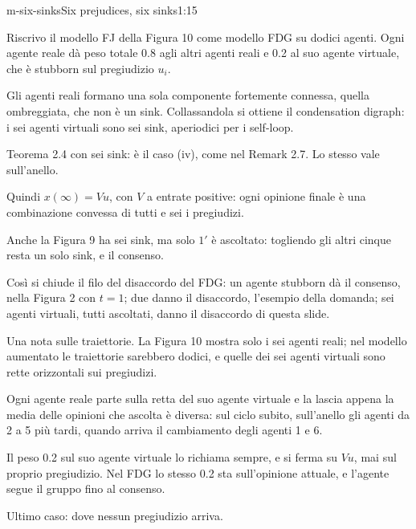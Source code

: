 \begin{slidedue}{m-six-sinks}{Six prejudices, six sinks}{1:15}
  \begin{discorso}
    \item Riscrivo il modello FJ della Figura 10 come modello FDG su dodici agenti. Ogni agente reale dà peso totale 0.8 agli altri agenti reali e 0.2 al suo agente virtuale, che è stubborn sul pregiudizio $u_i$.
    \item Gli agenti reali formano una sola componente fortemente connessa, quella ombreggiata, che non è un sink. Collassandola si ottiene il condensation digraph: i sei agenti virtuali sono sei sink, aperiodici per i self-loop.
    \item Teorema 2.4 con sei sink: è il caso (iv), come nel Remark 2.7. Lo stesso vale sull'anello.
    \item Quindi $x(\infty)=Vu$, con $V$ a entrate positive: ogni opinione finale è una combinazione convessa di tutti e sei i pregiudizi.
    \item Anche la Figura 9 ha sei sink, ma solo $1'$ è ascoltato: togliendo gli altri cinque resta un solo sink, e il consenso.
    \item Così si chiude il filo del disaccordo del FDG: un agente stubborn dà il consenso, nella Figura 2 con $t=1$; due danno il disaccordo, l'esempio della domanda; sei agenti virtuali, tutti ascoltati, danno il disaccordo di questa slide.
    \item \clic Una nota sulle traiettorie. La Figura 10 mostra solo i sei agenti reali; nel modello aumentato le traiettorie sarebbero dodici, e quelle dei sei agenti virtuali sono rette orizzontali sui pregiudizi.
    \item Ogni agente reale parte sulla retta del suo agente virtuale e la lascia appena la media delle opinioni che ascolta è diversa: sul ciclo subito, sull'anello gli agenti da 2 a 5 più tardi, quando arriva il cambiamento degli agenti 1 e 6.
    \item Il peso 0.2 sul suo agente virtuale lo richiama sempre, e si ferma su $Vu$, mai sul proprio pregiudizio. Nel FDG lo stesso 0.2 sta sull'opinione attuale, e l'agente segue il gruppo fino al consenso.
    \item Ultimo caso: dove nessun pregiudizio arriva.
  \end{discorso}
\end{slidedue}

